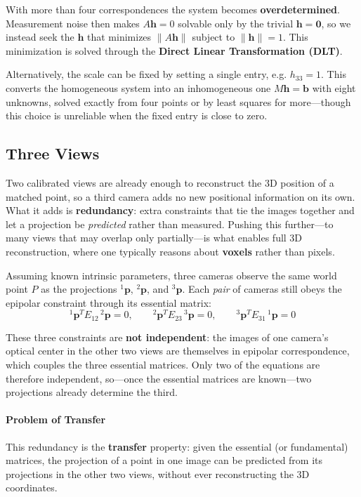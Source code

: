 With more than four correspondences the system becomes \textbf{overdetermined}.
Measurement noise then makes $A\boldsymbol{h} = 0$ solvable only by the trivial $\boldsymbol{h} = \boldsymbol{0}$, so we instead seek the $\boldsymbol{h}$ that minimizes $\lVert A\boldsymbol{h} \rVert$ subject to $\lVert \boldsymbol{h} \rVert = 1$.
This minimization is solved through the \textbf{Direct Linear Transformation (DLT)}.

Alternatively, the scale can be fixed by setting a single entry, e.g. $h_{33} = 1$.
This converts the homogeneous system into an inhomogeneous one $M\boldsymbol{h} = \boldsymbol{b}$ with eight unknowns, solved exactly from four points or by least squares for more—though this choice is unreliable when the fixed entry is close to zero.

\subsection{Three Views}
Two calibrated views are already enough to reconstruct the 3D position of a matched point, so a third camera adds no new positional information on its own.
What it adds is \textbf{redundancy}: extra constraints that tie the images together and let a projection be \emph{predicted} rather than measured.
Pushing this further—to many views that may overlap only partially—is what enables full 3D reconstruction, where one typically reasons about \textbf{voxels} rather than pixels.

Assuming known intrinsic parameters, three cameras observe the same world point $P$ as the projections $^1\boldsymbol{p}$, $^2\boldsymbol{p}$, and $^3\boldsymbol{p}$.
Each \emph{pair} of cameras still obeys the epipolar constraint through its essential matrix:
$$ {}^1\boldsymbol{p}^T E_{12}\, {}^2\boldsymbol{p} = 0, \qquad {}^2\boldsymbol{p}^T E_{23}\, {}^3\boldsymbol{p} = 0, \qquad {}^3\boldsymbol{p}^T E_{31}\, {}^1\boldsymbol{p} = 0 $$

These three constraints are \textbf{not independent}: the images of one camera's optical center in the other two views are themselves in epipolar correspondence, which couples the three essential matrices.
Only two of the equations are therefore independent, so—once the essential matrices are known—two projections already determine the third.

\paragraph{Problem of Transfer}
This redundancy is the \textbf{transfer} property: given the essential (or fundamental) matrices, the projection of a point in one image can be predicted from its projections in the other two views, without ever reconstructing the 3D coordinates.

